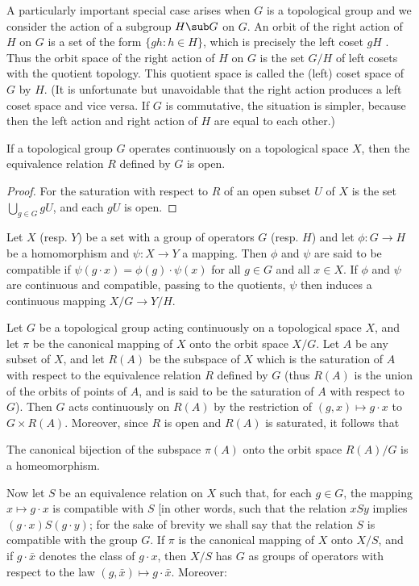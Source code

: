 A particularly important special case arises when $G$ is a topological group and we consider the action of a subgroup $H\sub G$ on $G$. An orbit of the right action of $H$ on $G$ is a set of the form $\{gh:h\in H\}$, which is precisely the left coset $gH$ . Thus the orbit space of the right action of $H$ on $G$ is the set $G/H$ of left cosets with the quotient topology. This quotient space is called the (left) coset space of $G$ by $H$. (It is unfortunate but unavoidable that the right action produces a left coset space and vice versa. If $G$ is commutative, the situation is simpler, because then the left action and right action of $H$ are equal to each other.)
\begin{proposition}\label{topological group action relation is open}
If a topological group $G$ operates continuously on a topological space $X$, then the equivalence relation $R$ defined by $G$ is open.
\end{proposition}
\begin{proof}
For the saturation with respect to $R$ of an open subset $U$ of $X$ is the set $\bigcup_{g\in G}gU$, and each $gU$ is open.
\end{proof}
Let $X$ (resp. $Y$) be a set with a group of operators $G$ (resp. $H$) and let $\phi:G\to H$ be a homomorphism and $\psi:X\to Y$ a mapping. Then $\phi$ and $\psi$ are said to be compatible if $\psi(g\cdot x)=\phi(g)\cdot\psi(x)$ for all $g\in G$ and all $x\in X$. If $\phi$ and $\psi$ are continuous and compatible, passing to the quotients, $\psi$ then induces a continuous mapping $X/G\to Y/H$.\par
Let $G$ be a topological group acting continuously on a topological space $X$, and let $\pi$ be the canonical mapping of $X$ onto the orbit space $X/G$. Let $A$ be any subset of $X$, and let $R(A)$ be the subspace of $X$ which is the saturation of $A$ with respect to the equivalence relation $R$ defined by $G$ (thus $R(A)$ is the union of the orbits of points of $A$, and is said to be the saturation of $A$ with respect to $G$). Then $G$ acts continuously on $R(A)$ by the restriction of $(g,x)\mapsto g\cdot x$ to $G\times R(A)$. Moreover, since $R$ is open and $R(A)$ is saturated, it follows that
\begin{proposition}\label{topological group action saturation quotient char}
The canonical bijection of the subspace $\pi(A)$ onto the orbit space $R(A)/G$ is a homeomorphism.
\end{proposition}
Now let $S$ be an equivalence relation on $X$ such that, for each $g\in G$, the mapping $x\mapsto g\cdot x$ is compatible with $S$ [in other words, such that the relation $xSy$ implies $(g\cdot x)S(g\cdot y)$; for the sake of brevity we shall say that the relation $S$ is compatible with the group $G$. If $\pi$ is the canonical mapping of $X$ onto $X/S$, and if $g\cdot\bar{x}$ denotes the class of $g\cdot x$, then $X/S$ has $G$ as groups of operators with respect to the law $(g,\bar{x})\mapsto g\cdot\bar{x}$. Moreover:

